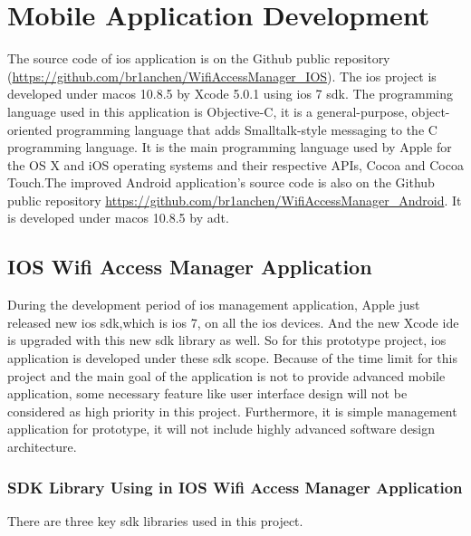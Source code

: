 \chapter{Mobile Application Development}
\label{chp:mobile_app}

\par The source code of \gls{ios} application is on the Github public repository (\url{https://github.com/br1anchen/WifiAccessManager_IOS}). The \gls{ios} project is developed under \gls{macos} 10.8.5 by Xcode 5.0.1 using \gls{ios} 7 \gls{sdk}. The programming language used in this application is Objective-C\cite{objc}, it is a general-purpose, object-oriented programming language that adds Smalltalk-style messaging to the C programming language. It is the main programming language used by Apple for the OS X and iOS operating systems and their respective APIs, Cocoa and Cocoa Touch.The improved Android application's source code is also on the Github public repository \url{https://github.com/br1anchen/WifiAccessManager_Android}. It is developed under \gls{macos} 10.8.5 by \gls{adt}.

\section{IOS Wifi Access Manager Application}

\par During the development period of \gls{ios} management application, Apple just released new \gls{ios} \gls{sdk},which is \gls{ios} 7, on all the \gls{ios} devices. And the new Xcode \gls{ide} is upgraded with this new \gls{sdk} library as well. So for this prototype project, \gls{ios} application is developed under these \gls{sdk} scope. Because of the time limit for this project and the main goal of the application is not to provide advanced mobile application, some necessary feature like user interface design will not be considered as high priority in this project. Furthermore, it is simple management application for prototype, it will not include highly advanced software design architecture.

\subsection{SDK Library Using in IOS Wifi Access Manager Application}
\par There are three key \gls{sdk} libraries used in this project. 

